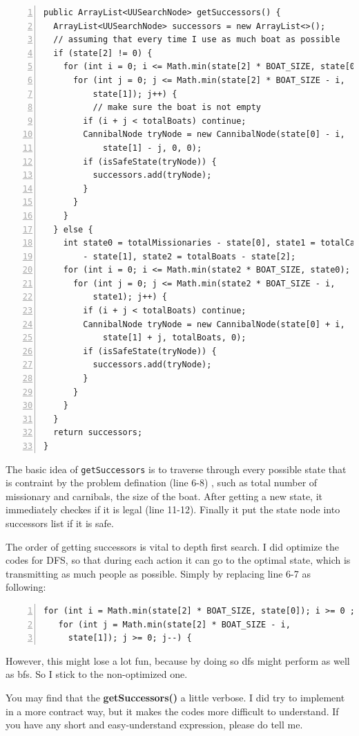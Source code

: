 \documentclass{article}
\begin{document}
\begin{lstlisting}[numbers=left]
public ArrayList<UUSearchNode> getSuccessors() {
  ArrayList<UUSearchNode> successors = new ArrayList<>();
  // assuming that every time I use as much boat as possible
  if (state[2] != 0) {
    for (int i = 0; i <= Math.min(state[2] * BOAT_SIZE, state[0]); i++) {
      for (int j = 0; j <= Math.min(state[2] * BOAT_SIZE - i,
          state[1]); j++) {
          // make sure the boat is not empty
        if (i + j < totalBoats)	continue;
        CannibalNode tryNode = new CannibalNode(state[0] - i,
            state[1] - j, 0, 0);
        if (isSafeState(tryNode)) {
          successors.add(tryNode);
        }
      }
    }
  } else {
    int state0 = totalMissionaries - state[0], state1 = totalCannibals
        - state[1], state2 = totalBoats - state[2];
    for (int i = 0; i <= Math.min(state2 * BOAT_SIZE, state0); i++) {
      for (int j = 0; j <= Math.min(state2 * BOAT_SIZE - i,
          state1); j++) {
        if (i + j < totalBoats)	continue;
        CannibalNode tryNode = new CannibalNode(state[0] + i,
            state[1] + j, totalBoats, 0);
        if (isSafeState(tryNode)) {
          successors.add(tryNode);
        }
      }
    }
  }
  return successors;
}
\end{lstlisting}

The basic idea of \verb`getSuccessors` is to traverse through every possible state that is contraint by the problem defination (line 6-8) , such as total number of missionary and carnibals, the size of the boat. After getting a new state, it immediately checkes if it is legal (line 11-12). Finally it put the state node into successors list if it is safe.

The order of getting successors is vital to depth first search. I did optimize the codes for DFS, so that during each action it can go to the optimal state, which is transmitting as much people as possible. Simply by replacing line 6-7 as following:

\begin{lstlisting}[numbers=left]
 for (int i = Math.min(state[2] * BOAT_SIZE, state[0]); i >= 0 ; i--) {
   for (int j = Math.min(state[2] * BOAT_SIZE - i,
     state[1]); j >= 0; j--) {
\end{lstlisting}

However, this might lose a lot fun, because by doing so dfs might perform as well as bfs. So I stick to the non-optimized one.

You may find that the \textbf{getSuccessors()} a little verbose. I did try to implement in a more contract way, but it makes the codes more difficult to understand. If you have any short and easy-understand expression, please do tell me.
\end{document}
